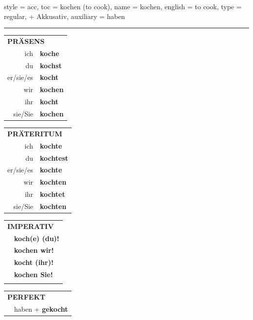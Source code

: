 \begin{verbentry}{
  style = {acc},
  toc = {kochen (to cook)},
  name = {kochen},
  english = {to cook},
  type = {regular, + Akkusativ},
  auxiliary = {haben}
}
 
    
     \vspace{5pt}

    \hrule
    
    \vspace{5pt}

  \begin{tabular}{rl}
     \multicolumn{2}{l}{\textbf{PRÄSENS} }\\
    ich & \textbf{koche}\\
    du & \textbf{kochst}\\
    er/sie/es & \textbf{kocht}\\
    wir & \textbf{kochen}\\
    ihr & \textbf{kocht}\\
    sie/Sie & \textbf{kochen}\\
  \end{tabular}
  \hfill
     \begin{tabular}{rl}
    \multicolumn{2}{l}{\textbf{PRÄTERITUM} }\\
    ich & \textbf{kochte}\\
    du & \textbf{kochtest}\\
    er/sie/es & \textbf{kochte}\\
    wir & \textbf{kochten}\\
    ihr & \textbf{kochtet}\\
    sie/Sie & \textbf{kochten}\\
  \end{tabular}
  \hfill
  \begin{tabular}{rl}
     \multicolumn{2}{l}{\textbf{IMPERATIV} }\\
   & \textbf{koch(e) (du)!}\\
   & \textbf{kochen wir!}\\
   & \textbf{kocht (ihr)!}\\
   & \textbf{kochen Sie!}\\
   & \vspace{10pt}
  \end{tabular}

    \vspace{10pt}

 \begin{tabular}{rl}
     \multicolumn{2}{l}{\textbf{PERFEKT}}\\
   & haben + \textbf{gekocht}\\
  \end{tabular}
\hfill
   \begin{tabular}{rl}
   

\end{tabular}
\end{verbentry}
